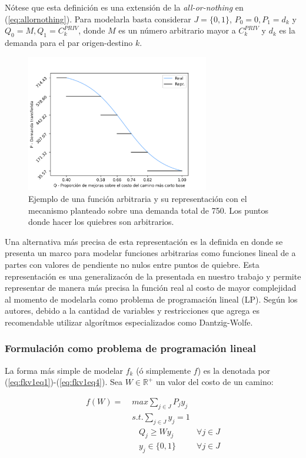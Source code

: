 \documentclass{article}
\begin{document}
  Nótese que esta definición es una extensión de la {\it all-or-nothing} en (\ref{eq:allornothing}). Para modelarla basta considerar $J = \{0, 1\}$, $P_0 = 0, P_1 = d_k$ y $Q_0 = M, Q_1 = C^{PRIV}_k$, donde $M$ es un número arbitrario mayor a $C^{PRIV}_k$ y $d_k$ es la demanda para el par origen-destino $k$.

  \begin{figure}[h!]
    \centering
    \includegraphics[width=8cm]{../resources/f_example.png}
    \caption{Ejemplo de una función arbitraria y su representación con el mecanismo planteado sobre una demanda total de 750. Los puntos donde hacer los quiebres son arbitrarios.}
    \label{fig:fdrawexample}
  \end{figure}

  Una alternativa más precisa de esta representación es la definida en \cite{Crainic2021} donde se presenta un marco para modelar funciones arbitrarias como funciones lineal de a partes con valores de pendiente no nulos entre puntos de quiebre. Esta representación es una generalizacón de la presentada en nuestro trabajo y permite representar de manera más precisa la función real al costo de mayor complejidad al momento de modelarla como problema de programación lineal (LP). Según los autores, debido a la cantidad de variables y restricciones que agrega es recomendable utilizar algorítmos especializados como Dantzig-Wolfe.

  \FloatBarrier
  \subsubsection{Formulación como problema de programación lineal}

  La forma más simple de modelar $f_k$ (ó simplemente $f$) es la denotada por (\ref{eq:fkv1eq1})-(\ref{eq:fkv1eq4}). Sea $W \in \mathbb{R}^+$ un valor del costo de un camino:

  \begin{align}
    f(W) =\; & max \sum_{j \in J} P_j y_j    & \label{eq:fkv1eq1} \\
             & s.t. \sum_{j \in J} y_j = 1   & \label{eq:fkv1eq2} \\
             & \;\;\; Q_j \geq W y_j         & \label{eq:fkv1eq3} \forall j \in J \\
             & \;\;\; y_j \in \{0,1\}        & \label{eq:fkv1eq4} \forall j \in J
  \end{align}
\end{document}
